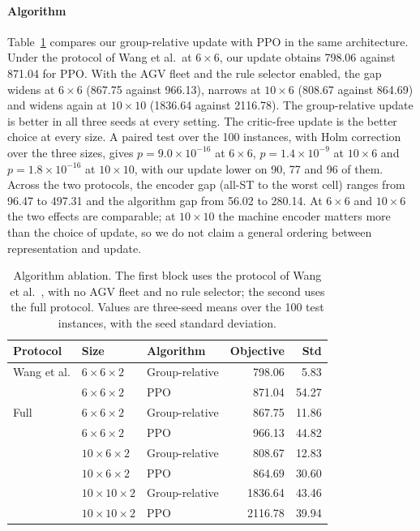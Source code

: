 \paragraph{Algorithm} Table~\ref{tab:algo} compares our group-relative update with PPO in the
same architecture. Under the protocol of Wang et al.\ at $6\times6$, our update
obtains 798.06 against 871.04 for PPO. With the AGV fleet and the rule
selector enabled, the gap widens at $6\times6$ (867.75 against 966.13),
narrows at $10\times6$ (808.67 against 864.69) and widens again at
$10\times10$ (1836.64 against 2116.78). The group-relative update is better in all three
seeds at every setting. The critic-free update is the better choice at every
size. A paired test over the 100 instances, with Holm correction
over the three sizes, gives $p=9.0\times10^{-16}$ at $6\times6$,
$p=1.4\times10^{-9}$ at $10\times6$ and $p=1.8\times10^{-16}$ at $10\times10$,
with our update lower on 90, 77 and 96 of them. Across the two protocols, the
encoder gap (all-ST to the worst cell) ranges from 96.47 to 497.31 and the
algorithm gap from 56.02 to 280.14. At $6\times6$ and $10\times6$ the two
effects are comparable; at $10\times10$ the machine encoder matters more than
the choice of update, so we do not claim a general ordering between
representation and update.

\begin{table}[t]
\centering
\caption{Algorithm ablation. The first block uses the protocol of Wang et
al.~\cite{wang2025multitarget}, with no AGV fleet and no rule selector; the
second uses the full protocol. Values are three-seed means over the 100 test
instances, with the seed standard deviation.}
\label{tab:algo}
\small
\setlength{\tabcolsep}{2.5pt}
\begin{tabular}{lllrr}
\toprule
Protocol & Size & Algorithm & Objective & Std \\
\midrule
Wang et al. & $6\times6\times2$ & Group-relative & 798.06 & 5.83 \\
 & $6\times6\times2$ & PPO & 871.04 & 54.27 \\
\midrule
Full & $6\times6\times2$ & Group-relative & 867.75 & 11.86 \\
 & $6\times6\times2$ & PPO & 966.13 & 44.82 \\
 & $10\times6\times2$ & Group-relative & 808.67 & 12.83 \\
 & $10\times6\times2$ & PPO & 864.69 & 30.60 \\
 & $10\times10\times2$ & Group-relative & 1836.64 & 43.46 \\
 & $10\times10\times2$ & PPO & 2116.78 & 39.94 \\
\bottomrule
\end{tabular}
\end{table}

